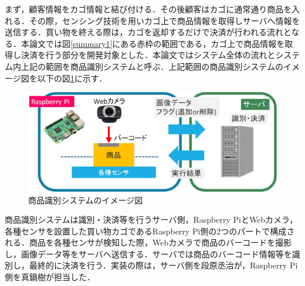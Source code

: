 まず，顧客情報をカゴ情報と結び付ける．その後顧客はカゴに通常通り商品を入れる．その際，センシング技術を用いカゴ上で商品情報を取得しサーバへ情報を送信する．買い物を終える際は，カゴを返却するだけで決済が行われる流れとなる．本論文では図\ref{summary1}にある赤枠の範囲である，カゴ上で商品情報を取得し決済を行う部分を開発対象とした．本論文ではシステム全体の流れとシステム内上記の範囲を商品識別システムと呼ぶ．上記範囲の商品識別システムのイメージ図を以下の図\ref{summary2}に示す．


\begin{figure}[htbp]
\centering
\includegraphics[width = 15cm]{./picture/summary2.eps}
\caption{商品識別システムのイメージ図}
\label{summary2}
\end{figure}


商品識別システムは識別・決済等を行うサーバ側，Raspberry PiとWebカメラ，各種センサを設置した買い物カゴであるRaspberry Pi側の2つのパートで構成される．商品を各種センサが検知した際，Webカメラで商品のバーコードを撮影し，画像データ等をサーバへ送信する．サーバでは商品のバーコード情報等を識別し，最終的に決済を行う．実装の際は，サーバ側を段原丞治が，Raspberry Pi側を真鍋樹が担当した．